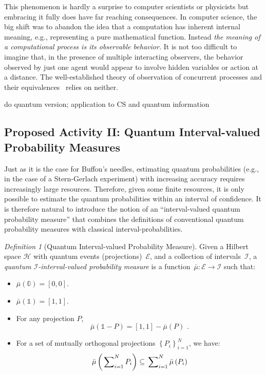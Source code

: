 \documentclass{article}
\theoremstyle{remark}
\newtheorem{definition}{Definition}
\newcommand{\Hilb}{\mathcal{H}}
\newcommand{\events}{\ensuremath{\mathcal{E}}}
\begin{document}
This phenomenon is hardly a surprise to computer scientists or
physicists but embracing it fully does have far reaching
consequences. In computer science, the big shift was to abandon the
idea that a computation has inherent internal meaning, e.g.,
representing a pure mathematical function. Instead \emph{the meaning
  of a computational process is its observable behavior.} It is not
too difficult to imagine that, in the presence of multiple interacting
observers, the behavior observed by just one agent would appear to
involve hidden variables or action at a distance. The well-established
theory of observation of concurrent processes and their
equivalences~\cite{Hennessy1989} relies on neither.

do quantum version; application to CS and quantum information

\subsection{Proposed Activity II: Quantum Interval-valued Probability Measures}
 
Just as it is the case for Buffon's needles, estimating quantum
probabilities (e.g., in the case of a Stern-Gerlach experiment) with
increasing accuracy requires increasingly large resources.  Therefore,
given some finite resources, it is only possible to estimate the
quantum probabilities within an interval of confidence. It is
therefore natural to introduce the notion of an ``interval-valued
quantum probability measure'' that combines the definitions of
conventional quantum probability measures with classical
interval-probabilities.

\begin{definition}[Quantum Interval-valued Probability Measure]\label{def:QuantumInterval-valuedProbability}
  Given a Hilbert space $\Hilb$ with quantum events
  (projections)~$\events$, and a collection of
  intervals~$\mathscr{I}$, a \emph{quantum
    $\mathscr{I}$-interval-valued probability measure} is a
  function~$\bar{\mu}:\events\rightarrow\mathscr{I}$ such that:
\begin{itemize}
\item $\bar{\mu}(\mathbb{0})=\left[0,0\right]$. 
\item $\bar{\mu}(\mathbb{1})=\left[1,1\right]$. 
\item For any projection $P$, 
\begin{equation}
\bar{\mu}\left(\mathbb{1}-P\right)=\left[1,1\right]-\bar{\mu}\left(P\right)\textrm{ .}\label{eq:QuantumInterval-valuedProbability-Complement}
\end{equation}
\item For a set of mutually orthogonal projections $\left\{ P_{i}\right\} _{i=1}^{N}$,
we have:
\begin{equation}
\bar{\mu}\left(\sideset{}{_{i=1}^{N}}\sum P_{i}\right)\subseteq\sideset{}{_{i=1}^{N}}\sum\bar{\mu}\left(P_{i}\right)
\label{eq:QuantumInterval-valuedProbability-Inclusion}
\end{equation}
\end{itemize}
\end{definition}
\end{document}
